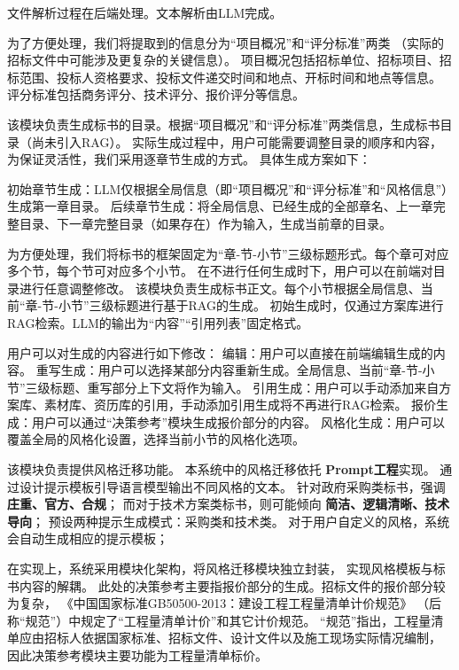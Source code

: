 \documentclass{xmu}
\begin{document}
文件解析过程在后端处理。文本解析由LLM完成。

为了方便处理，我们将提取到的信息分为“项目概况”和“评分标准”两类
（实际的招标文件中可能涉及更复杂的关键信息）。
项目概况包括招标单位、招标项目、招标范围、投标人资格要求、投标文件递交时间和地点、开标时间和地点等信息。
评分标准包括商务评分、技术评分、报价评分等信息。

该模块负责生成标书的目录。根据“项目概况”和“评分标准”两类信息，生成标书目录（尚未引入RAG）。
实际生成过程中，用户可能需要调整目录的顺序和内容，为保证灵活性，我们采用逐章节生成的方式。
具体生成方案如下：

初始章节生成：LLM仅根据全局信息（即“项目概况”和“评分标准”和“风格信息”）生成第一章目录。
后续章节生成：将全局信息、已经生成的全部章名、上一章完整目录、下一章完整目录（如果存在）作为输入，生成当前章的目录。

为方便处理，我们将标书的框架固定为“章-节-小节”三级标题形式。每个章可对应多个节，每个节可对应多个小节。
在不进行任何生成时下，用户可以在前端对目录进行任意调整修改。
该模块负责生成标书正文。每个小节根据全局信息、当前“章-节-小节”三级标题进行基于RAG的生成。
初始生成时，仅通过方案库进行RAG检索。LLM的输出为“内容”“引用列表”固定格式。

用户可以对生成的内容进行如下修改：
编辑：用户可以直接在前端编辑生成的内容。
重写生成：用户可以选择某部分内容重新生成。全局信息、当前“章-节-小节”三级标题、重写部分上下文将作为输入。
引用生成：用户可以手动添加来自方案库、素材库、资历库的引用，手动添加引用生成将不再进行RAG检索。
报价生成：用户可以通过“决策参考”模块生成报价部分的内容。
风格化生成：用户可以覆盖全局的风格化设置，选择当前小节的风格化选项。

该模块负责提供风格迁移功能。
本系统中的风格迁移依托 {\bf Prompt工程}实现。
通过设计提示模板引导语言模型输出不同风格的文本。
针对政府采购类标书，强调 {\bf 庄重、官方、合规}；
而对于技术方案类标书，则可能倾向 {\bf 简洁、逻辑清晰、技术导向}；
预设两种提示生成模式：采购类和技术类。
对于用户自定义的风格，系统会自动生成相应的提示模板；

在实现上，系统采用模块化架构，将风格迁移模块独立封装，
实现风格模板与标书内容的解耦。
此处的决策参考主要指报价部分的生成。招标文件的报价部分较为复杂，
《中国国家标准GB50500-2013：建设工程工程量清单计价规范》
（后称“规范”）中规定了“工程量清单计价”和其它计价规范。
“规范”指出，工程量清单应由招标人依据国家标准、招标文件、设计文件以及施工现场实际情况编制，
因此决策参考模块主要功能为工程量清单标价。
\end{document}
